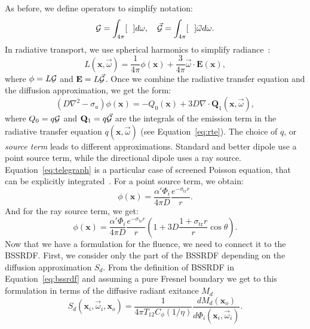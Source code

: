 As before, we define operators to simplify notation:
\begin{equation*}
\operator{G} = \int_{4\pi} [\ \ ] d\omega, \ \ \ \vec{\operator{G}} = \int_{4\pi} [\ \ ] \vec{\omega} d\omega.
\end{equation*}
In radiative transport, we use spherical harmonics to simplify radiance~\cite{Case1967}:
\begin{equation*}
L(\mathbf{x}, \vec{\omega}) = \frac{1}{4\pi}\phi(\mathbf{x}) + \frac{3}{4\pi} \vec{\omega} \cdot \mathbf{E}(\mathbf{x}),
\end{equation*}
where $\phi = L \mathcal{G}$ and $\mathbf{E} = L \vec{\mathcal{G}}$. Once we combine the radiative transfer equation and the diffusion approximation, we get the form:
\begin{equation}
\label{eq:telegraph}
(D \nabla^2 - \sigma_a)\phi(\mathbf{x}) = -Q_0(\mathbf{x}) + 3D \nabla \cdot \mathbf{Q}_1(\mathbf{x}, \vec{\omega}),
\end{equation}
where $Q_0 = q \mathcal{G}$ and $\mathbf{Q}_1 = q \vec{\mathcal{G}}$ are the integrals of the emission term in the radiative transfer equation $q(\mathbf{x}, \vec{\omega})$ (see Equation~\ref{eq:rte}). The choice of $q$, or \emph{source term} leads to different approximations. Standard and better dipole use a point source term, while the directional dipole uses a ray source. Equation~\ref{eq:telegraph} is a particular case of screened Poisson equation, that can be explicitly integrated~\cite{Fetter2003}. For a point source term, we obtain:
\begin{equation}
\label{eq:fluencepoint}
\phi(\mathbf{x}) = \frac{\alpha' \Phi_i}{4 \pi D} \frac{e^{-\sigma_\text{tr} r}}{r}.
\end{equation}
And for the ray source term, we get:
\begin{equation}
\label{eq:fluenceray}
\phi(\mathbf{x}) = \frac{\alpha' \Phi_i}{4 \pi D} \frac{e^{-\sigma_\text{tr} r}}{r} \left(1 + 3D \frac{1 + \sigma_\text{tr} r}{r} \cos\theta \right).
\end{equation}
Now that we have a formulation for the fluence, we need to connect it to the BSSRDF. First, we consider only the part of the BSSRDF depending on the diffusion approximation $S_d$. From the definition of BSSRDF in Equation~\ref{eq:bssrdf} and assuming a pure Fresnel boundary we get to this formulation in terms of the diffusive radiant exitance $M_d$
\begin{equation*}
S_d(\mathbf{x}_i, \vec{\omega}_i, \mathbf{x}_o)  =  \frac{1}{4\pi T_{12}C_\phi(1/\eta)} \frac{d M_d(\mathbf{x}_o)}{d \Phi_i(\mathbf{x}_i, \vec{\omega}_i)} .
\end{equation*} 
